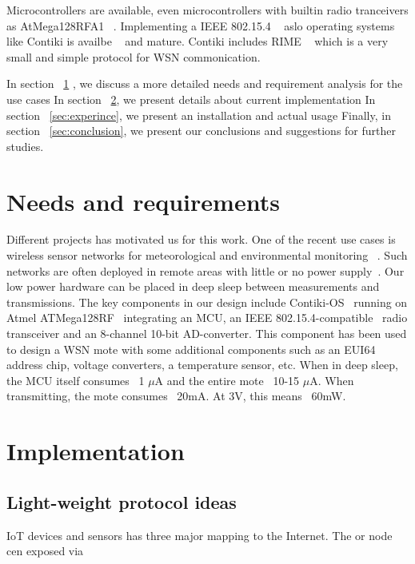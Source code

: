 \documentclass[conference, a4paper,10pt,twocolumn]{IEEEtran}
\begin{document}
Microcontrollers are available, even microcontrollers with builtin radio tranceivers 
as AtMega128RFA1 ~\cite{ATMEGA}. Implementing a IEEE 802.15.4 ~\cite{802154} aslo operating 
systems like Contiki is availbe ~\cite{CONTIKI} and mature. Contiki includes RIME ~\cite{CONTIKI} 
which is a very small and simple protocol for WSN commonication.


In section ~\ref{sec:needs} , we discuss a more detailed needs and requirement analysis for the use cases
In section ~\ref{sec:implementation}, we present details about current implementation  
In section ~\ref{sec:experince}, we present an installation and actual usage
Finally, in section ~\ref{sec:conclusion}, we present our conclusions and suggestions for further studies.

\section{Needs and requirements}
\label{sec:needs}


Different projects has motivated us for this work. One of the recent use cases is wireless sensor 
networks for meteorological and environmental monitoring ~\cite{WIMEA}. 
Such networks are often deployed in remote areas with little or no power supply~\cite{UBIQUI}.  
Our low power hardware can be placed in deep sleep between measurements and transmissions.  The key 
components in our design include  Contiki-OS~\cite{CONTIKI} running on Atmel ATMega128RF~\cite{ATMEGA} 
integrating an MCU, an IEEE 802.15.4-compatible~\cite{802154} radio transceiver and an 8-channel 10-bit 
AD-converter. This component has been used to design a WSN mote with some additional components such 
as an EUI64 address chip, voltage converters, a temperature sensor, etc. When in deep sleep, the MCU 
itself consumes ~1 $\mu$A and the entire mote ~10-15 $\mu$A. When transmitting, the mote consumes 
~20mA. At 3V, this means ~60mW. 


\section{Implementation}
\label{sec:implementation}

\subsection{Light-weight protocol ideas}

IoT devices and sensors has three major mapping to the Internet. The 
or node cen exposed via
\end{document}
